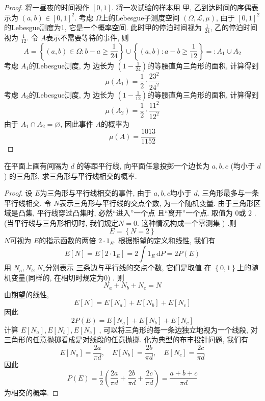 \documentclass[../main.tex]{subfiles}
\begin{document}
\begin{proof}
    将一昼夜的时间视作 \(  \left[ 0,1 \right]   \). 将一次试验的样本用 甲, 乙到达时间的序偶表示为 \(  \left( a,b \right)\in \left[ 0,1 \right]^{2}    \). 考虑 \(   \Omega   \)上的Lebesgue子测度空间  \(  \left(  \Omega , \mathcal{L}, \mu  \right)   \), 由于 \(  \left[ 0,1 \right]^{2}   \)的Lebesgue测度为1, 它是一个概率空间. 此时甲的停泊时间视为 \(  \frac{1 }{24 }   \), 乙的停泊时间视为 \(  \frac{1 }{12 }   \). 令 \(  A  \)表示不需要等待的事件, 则 \[
    A= \left\{ \left( a,b \right)\in  \Omega : b-a\ge \frac{1 }{24 }   \right\}\cup \left\{ \left( a,b \right): a-b\ge \frac{1 }{12 }   \right\}= :A_1\cup A_2
    \]   考虑 \(  A_1  \)的Lebesgue测度, 为  边长为 \(  \left( 1-\frac{1 }{24 }  \right)   \)的等腰直角三角形的面积, 计算得到 \[
    \mu \left( A_1 \right)= \frac{1}{2}\cdot \frac{23^{2} }{24^{2} }  
    \] 考虑 \(  A_2  \)的Lebesgue测度, 为 边长为 \(  \left( 1-\frac{1 }{12 }  \right)   \)的等腰直角三角形的面积, 计算得到 \[
    \mu \left( A_2 \right)= \frac{1 }{2 }\cdot  \frac{11^{2} }{12 ^{2} }   
    \]  由于 \(  A_1\cap A_2= \varnothing  \), 因此事件 \(  A  \)的概率为 \[
    \mu \left( A \right)= \frac{1013 }{1152 } 
    \]  
\end{proof}
\begin{exercise}{}{}
在平面上画有间隔为 $d$ 的等距平行线, 向平面任意投掷一个边长为 $a,b,c$ (均小于 $d$) 的三角形, 求三角形与平行线相交的概率.
\end{exercise}

\begin{proof}
    设 \(  E  \)为三角形与平行线相交的事件, 由于 \(  a,b,c  \)均小于 \(  d  \), 三角形最多与一条平行线相交.  令 \(  N  \)表示三角形与平行线的交点个数, 为一个随机变量.  由于三角形区域是凸集, 平行线穿过凸集时, 必然``进入''一个点 且``离开''一个点. 取值为 \(  0  \)或 \(  2  \)  . (当平行线与三角形相切时, 我们规定\(  N= 0  \). 这种情况构成一个零测集 ) .则 \[
    E= \left\{ N= 2 \right\}
    \] \(  N  \)可视为 \(  E  \)的指示函数的两倍 \(2\cdot   1_{E} \).   根据期望的定义和线性, 我们有 \[
    E[N]= E[2\cdot 1_{E}]= 2\int 1_{E} \,\mathrm{d} P= 2P\left( E \right) 
    \]用 \(  N_{a}, N_{b},N_{c}  \)分别表示 三条边与平行线的交点个数, 它们是取值 在 \(  \left\{ 0,1 \right\}  \)上的随机变量(同样的, 在相切时规定为0) . 则 \[
    N_{a}+ N_{b}+ N_{c}= N
    \] 由期望的线性,  \[
    E[N]= E[N_{a}]+ E[N_{b}]+ E[N_{c}]
    \]因此 \[
    2 P\left( E \right)= E[N_{a}] + E[N_{b}]+ E[N_{c}]
    \]计算 \(  E[N_{a}]  ,E[N_{b}], E[N_{c}]\) , 可以将三角形的每一条边独立地视为一个线段, 对三角形的任意抛掷看成是对线段的任意抛掷. 化为典型的布丰投针问题, 我们有 \[
    E[N_{a}]= \frac{2a }{ \pi d },\quad  E[N_{b}]= \frac{2b }{ \pi d }, \quad E[N_{c}]= \frac{2c }{ \pi d }
    \]因此 \[
    P\left( E \right)=\frac{1}{2} \left( \frac{2a }{ \pi d }+ \frac{2b }{  \pi d }+ \frac{2c }{  \pi d } \right) = \frac{a+ b+ c }{ \pi d } 
    \]为相交的概率.
\end{proof}
\end{document}
